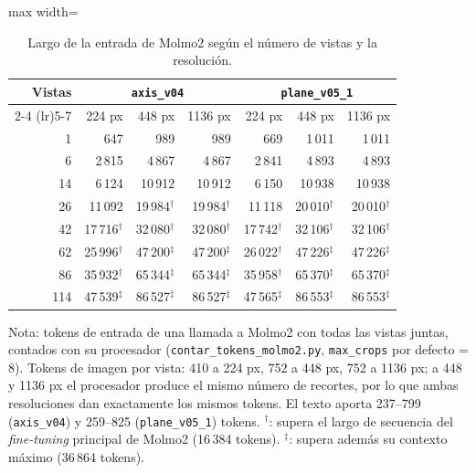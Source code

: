 
\begin{table}[htbp]
\centering
\caption{Largo de la entrada de Molmo2 según el número de vistas y la resolución.}
\label{tab:tokens_procesador}
\begin{lrbox}{\tablebox}
\begin{adjustbox}{max width=\textwidth}
\begin{tabular}{rrrrrrr}
\toprule
\multirow{2}{*}{Vistas} & \multicolumn{3}{c}{\texttt{axis\_v04}} & \multicolumn{3}{c}{\texttt{plane\_v05\_1}} \\
\cmidrule(lr){2-4} \cmidrule(lr){5-7}
 & 224 px & 448 px & 1136 px & 224 px & 448 px & 1136 px \\
\midrule
1 & 647 & 989 & 989 & 669 & 1\,011 & 1\,011 \\
6 & 2\,815 & 4\,867 & 4\,867 & 2\,841 & 4\,893 & 4\,893 \\
14 & 6\,124 & 10\,912 & 10\,912 & 6\,150 & 10\,938 & 10\,938 \\
26 & 11\,092 & 19\,984$^{\dagger}$ & 19\,984$^{\dagger}$ & 11\,118 & 20\,010$^{\dagger}$ & 20\,010$^{\dagger}$ \\
42 & 17\,716$^{\dagger}$ & 32\,080$^{\dagger}$ & 32\,080$^{\dagger}$ & 17\,742$^{\dagger}$ & 32\,106$^{\dagger}$ & 32\,106$^{\dagger}$ \\
62 & 25\,996$^{\dagger}$ & 47\,200$^{\ddagger}$ & 47\,200$^{\ddagger}$ & 26\,022$^{\dagger}$ & 47\,226$^{\ddagger}$ & 47\,226$^{\ddagger}$ \\
86 & 35\,932$^{\dagger}$ & 65\,344$^{\ddagger}$ & 65\,344$^{\ddagger}$ & 35\,958$^{\dagger}$ & 65\,370$^{\ddagger}$ & 65\,370$^{\ddagger}$ \\
114 & 47\,539$^{\ddagger}$ & 86\,527$^{\ddagger}$ & 86\,527$^{\ddagger}$ & 47\,565$^{\ddagger}$ & 86\,553$^{\ddagger}$ & 86\,553$^{\ddagger}$ \\
\bottomrule
\end{tabular}
\end{adjustbox}
\end{lrbox}
\usebox{\tablebox}

\vspace{1.5ex}
\begin{minipage}{\wd\tablebox}
\footnotesize
Nota: tokens de entrada de una llamada a Molmo2 con todas las vistas juntas, contados con su procesador (\texttt{contar\_tokens\_molmo2.py}, \texttt{max\_crops} por defecto = 8). Tokens de imagen por vista: 410 a 224 px, 752 a 448 px, 752 a 1136 px; a 448 y 1136 px el procesador produce el mismo número de recortes, por lo que ambas resoluciones dan exactamente los mismos tokens. El texto aporta 237--799 (\texttt{axis\_v04}) y 259--825 (\texttt{plane\_v05\_1}) tokens. $^{\dagger}$: supera el largo de secuencia del \textit{fine-tuning} principal de Molmo2 (16\,384 tokens). $^{\ddagger}$: supera además su contexto máximo (36\,864 tokens). 
\end{minipage}
\end{table}

